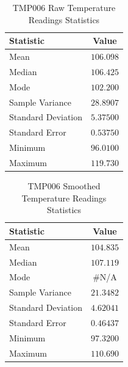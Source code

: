 \begin{table}[H]
\caption{\label{tab:raw_signal} TMP006 Raw Temperature Readings Statistics}
\centering
\begin{tabular}{l|c}
\hline\hline
\textbf{Statistic}      & \textbf{Value}            \\\hline
Mean                    & $106.098$                 \\\hline
Median                  & $106.425$                 \\\hline
Mode  	                & $102.200$                 \\\hline
Sample Variance         & $28.8907$                 \\\hline
Standard Deviation      & $5.37500$                 \\\hline
Standard Error  	    & $0.53750$                 \\\hline
Minimum                 & $96.0100$                 \\\hline
Maximum                 & $119.730$                 \\\hline
\end{tabular}
\end{table}

\begin{table}[H]
\caption{\label{tab:ema_signal} TMP006 Smoothed Temperature Readings Statistics}
\centering
\begin{tabular}{l|c}
\hline\hline
\textbf{Statistic}      & \textbf{Value}            \\\hline
Mean                    & $104.835$                 \\\hline
Median                  & $107.119$                 \\\hline
Mode  	                &   \#N/A                   \\\hline
Sample Variance         & $21.3482$                 \\\hline
Standard Deviation      & $4.62041$                 \\\hline
Standard Error  	    & $0.46437$                 \\\hline
Minimum                 & $97.3200$                 \\\hline
Maximum                 & $110.690$                 \\\hline
\end{tabular}
\end{table}

